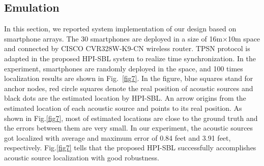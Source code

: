 
		

\subsection{Emulation}


In this section, we reported system implementation of our design based on smartphone arrays.
The 30 smartphones are deployed in a size of 16m$\times$10m space and connected by CISCO CVR328W-K9-CN wireless router.
TPSN protocol is adapted in the proposed HPI-SBL system to realize time synchronization.
In the experiment, smartphones are randomly deployed in the space, and 100 times localization results are shown in Fig.~\ref{fig7}. 
In the figure, blue squares stand for anchor
nodes, red circle squares denote the real position of acoustic sources and black dots are the estimated location by HPI-SBL. 
An arrow origins from the estimated location of each acoustic source and points to its real position. 
As shown in Fig.\ref{fig7}, most of estimated locations are close to the ground truth and the errors between them are very small.
In our experiment, the acoustic sources got localized with average and maximum error of 0.84 feet and 3.91 feet, respectively. Fig.\ref{fig7} tells that
the proposed HPI-SBL successfully accomplishes acoustic source localization with good robustness.


